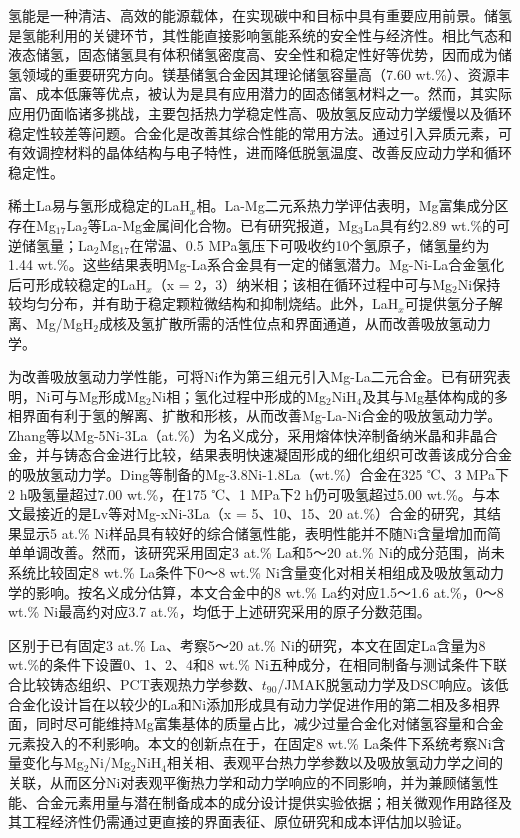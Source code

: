 \documentclass[UTF8,10pt]{ctexart}
\begin{document}
\makermfrontmatter
\nocite{ref1,ref2,ref3,ref4,ref5,ref6,ref7,ref8,ref9,ref10,ref11,ref12,ref13,ref14,ref15,ref16,ref17,ref18,ref19,ref20}

氢能是一种清洁、高效的能源载体，在实现碳中和目标中具有重要应用前景\cite{ref1}。储氢是氢能利用的关键环节，其性能直接影响氢能系统的安全性与经济性。相比气态和液态储氢，固态储氢具有体积储氢密度高、安全性和稳定性好等优势，因而成为储氢领域的重要研究方向\cite{ref2}。镁基储氢合金因其理论储氢容量高（7.60 wt.\%）、资源丰富、成本低廉等优点，被认为是具有应用潜力的固态储氢材料之一\cite{ref3}。然而，其实际应用仍面临诸多挑战，主要包括热力学稳定性高、吸放氢反应动力学缓慢以及循环稳定性较差等问题\cite{ref4}。合金化是改善其综合性能的常用方法\cite{ref5,ref6,ref7}。通过引入异质元素，可有效调控材料的晶体结构与电子特性，进而降低脱氢温度、改善反应动力学和循环稳定性。

稀土La易与氢形成稳定的LaH$_x$相。La-Mg二元系热力学评估表明，Mg富集成分区存在Mg$_{17}$La$_2$等La-Mg金属间化合物\cite{ref8}。已有研究报道，Mg$_3$La具有约2.89 wt.\%的可逆储氢量\cite{ref9}；La$_2$Mg$_{17}$在常温、0.5 MPa氢压下可吸收约10个氢原子，储氢量约为1.44 wt.\%\cite{ref10}。这些结果表明Mg-La系合金具有一定的储氢潜力。Mg-Ni-La合金氢化后可形成较稳定的LaH$_x$（x = 2，3）纳米相；该相在循环过程中可与Mg$_2$Ni保持较均匀分布，并有助于稳定颗粒微结构和抑制烧结\cite{ref11}。此外，LaH$_x$可提供氢分子解离、Mg/MgH$_2$成核及氢扩散所需的活性位点和界面通道，从而改善吸放氢动力学\cite{ref11,ref12}。

为改善吸放氢动力学性能，可将Ni作为第三组元引入Mg-La二元合金。已有研究表明，Ni可与Mg形成Mg$_2$Ni相；氢化过程中形成的Mg$_2$NiH$_4$及其与Mg基体构成的多相界面有利于氢的解离、扩散和形核，从而改善Mg-La-Ni合金的吸放氢动力学\cite{ref11,ref12}。Zhang等\cite{ref7}以Mg-5Ni-3La（at.\%）为名义成分，采用熔体快淬制备纳米晶和非晶合金，并与铸态合金进行比较，结果表明快速凝固形成的细化组织可改善该成分合金的吸放氢动力学。Ding等\cite{ref12}制备的Mg-3.8Ni-1.8La（wt.\%）合金在325 ℃、3 MPa下2 h吸氢量超过7.00 wt.\%，在175 ℃、1 MPa下2 h仍可吸氢超过5.00 wt.\%。与本文最接近的是Lv等\cite{ref15}对Mg-xNi-3La（x = 5、10、15、20 at.\%）合金的研究，其结果显示5 at.\% Ni样品具有较好的综合储氢性能，表明性能并不随Ni含量增加而简单单调改善。然而，该研究采用固定3 at.\% La和5～20 at.\% Ni的成分范围，尚未系统比较固定8 wt.\% La条件下0～8 wt.\% Ni含量变化对相关相组成及吸放氢动力学的影响。按名义成分估算，本文合金中的8 wt.\% La约对应1.5～1.6 at.\%，0～8 wt.\% Ni最高约对应3.7 at.\%，均低于上述研究采用的原子分数范围。

区别于已有固定3 at.\% La、考察5～20 at.\% Ni的研究\cite{ref15}，本文在固定La含量为8 wt.\%的条件下设置0、1、2、4和8 wt.\% Ni五种成分，在相同制备与测试条件下联合比较铸态组织、PCT表观热力学参数、$t_{90}$/JMAK脱氢动力学及DSC响应。该低合金化设计旨在以较少的La和Ni添加形成具有动力学促进作用的第二相及多相界面，同时尽可能维持Mg富集基体的质量占比，减少过量合金化对储氢容量和合金元素投入的不利影响。本文的创新点在于，在固定8 wt.\% La条件下系统考察Ni含量变化与Mg$_2$Ni/Mg$_2$NiH$_4$相关相、表观平台热力学参数以及吸放氢动力学之间的关联，从而区分Ni对表观平衡热力学和动力学响应的不同影响，并为兼顾储氢性能、合金元素用量与潜在制备成本的成分设计提供实验依据；相关微观作用路径及其工程经济性仍需通过更直接的界面表征、原位研究和成本评估加以验证。
\end{document}
